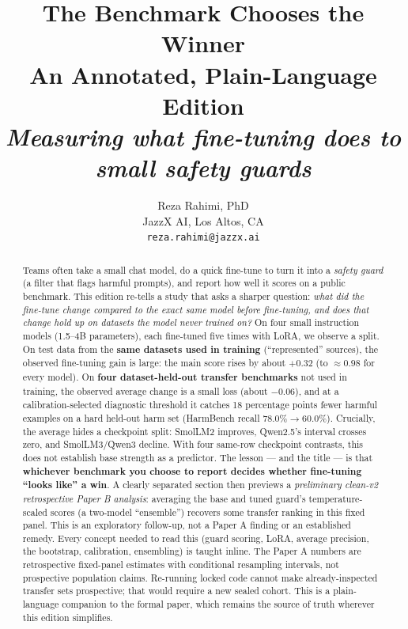 \documentclass[11pt]{article}
\title{\textbf{The Benchmark Chooses the Winner}\\[2pt]
\large An Annotated, Plain-Language Edition\\[2pt]
\normalsize\itshape Measuring what fine-tuning does to small safety guards}
\author{Reza Rahimi, PhD \\ \small JazzX AI, Los Altos, CA \\ \small\texttt{reza.rahimi@jazzx.ai}}
\date{}
\begin{document}
\maketitle

\begin{abstract}
\noindent
Teams often take a small chat model, do a quick fine-tune to turn it into a
\emph{safety guard} (a filter that flags harmful prompts), and report how well it scores
on a public benchmark. This edition re-tells a study that asks a sharper question:
\emph{what did the fine-tune change compared to the exact same model before fine-tuning,
and does that change hold up on datasets the model never trained on?} On four small
instruction models (1.5--4B parameters), each fine-tuned five times with LoRA, we observe a
split. On test data from the \textbf{same datasets used in training} (``represented''
sources), the observed fine-tuning gain is large: the main score rises by about
\textbf{$+0.32$} (to $\approx0.98$ for every model). On \textbf{four dataset-held-out
transfer benchmarks} not used in training, the observed average change is a small loss
(about \textbf{$-0.06$}), and at a calibration-selected diagnostic threshold it catches
18 percentage points fewer harmful examples on a hard
held-out harm set (HarmBench recall $78.0\%\!\to\!60.0\%$). Crucially, the average hides a
checkpoint split: SmolLM2 improves, Qwen2.5's interval crosses zero, and SmolLM3/Qwen3 decline.
With four same-row checkpoint contrasts, this does not establish base strength as a predictor. The
lesson --- and the title --- is that \textbf{whichever benchmark you choose to report decides
whether fine-tuning ``looks like'' a win}. A clearly separated section then previews a
\emph{preliminary clean-v2 retrospective Paper B analysis}: averaging the base and tuned guard's temperature-scaled
scores (a two-model ``ensemble'') recovers some transfer ranking in this fixed panel. This is
an exploratory follow-up, not a Paper A finding or an established remedy. Every concept
needed to read this (guard scoring, LoRA, average precision, the bootstrap, calibration,
ensembling) is taught inline. The Paper A numbers are retrospective fixed-panel estimates with
conditional resampling intervals, not prospective population claims. Re-running locked code
cannot make already-inspected transfer sets prospective; that would require a new sealed
cohort. This is a plain-language companion to the formal paper, which remains the source
of truth wherever this edition simplifies.
\end{abstract}
\end{document}

